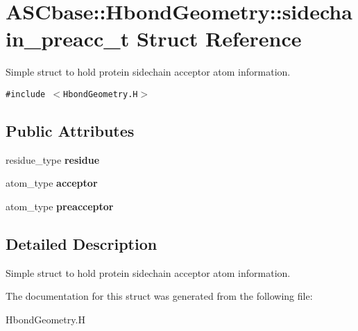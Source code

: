 \section{ASCbase::Hbond\-Geometry::sidechain\_\-preacc\_\-t Struct Reference}
\label{structASCbase_1_1HbondGeometry_1_1sidechain__preacc__t}
Simple struct to hold protein sidechain acceptor atom information.  


{\tt \#include $<$Hbond\-Geometry.H$>$}

\subsection*{Public Attributes}
\begin{CompactItemize}
\item 
residue\_\-type \textbf{residue}\label{structASCbase_1_1HbondGeometry_1_1sidechain__preacc__t_eb2bb27d2a3ce829a482dd175d1ab5e3}

\item 
atom\_\-type \textbf{acceptor}\label{structASCbase_1_1HbondGeometry_1_1sidechain__preacc__t_f80b810eca83f029297a82b47cf8208d}

\item 
atom\_\-type \textbf{preacceptor}\label{structASCbase_1_1HbondGeometry_1_1sidechain__preacc__t_6fa0c8f17d817856ddb4bbd27a1b6857}

\end{CompactItemize}


\subsection{Detailed Description}
Simple struct to hold protein sidechain acceptor atom information. 



The documentation for this struct was generated from the following file:\begin{CompactItemize}
\item 
Hbond\-Geometry.H\end{CompactItemize}
